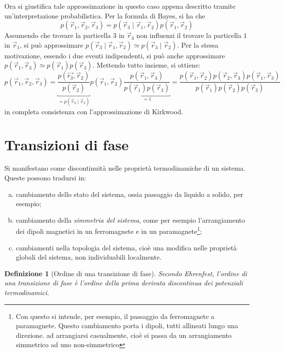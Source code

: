 \documentclass[11pt, a4paper]{scrartcl}
\theoremstyle{style}
\newtheorem{definizione}{Definizione}[section]
\theoremstyle{style1}
\numberwithin{equation}{subsection}
\begin{document}
Ora si giustifica tale approssimazione in questo caso appena descritto tramite un'interpretazione probabilistica.
Per la formula di Bayes, si ha che
\[
p(\vec{r}_1,\vec{r}_2, \vec{r}_3) = p(\vec{r}_3  \mid \vec{r}_1,\vec{r}_2) p(\vec{r}_1,\vec{r}_2)
\] 
Assumendo che trovare la particella $3$ in $\vec{r}_3$ non influenzi il trovare la particella $1$ in $\vec{r}_1$, si pu\`o approssimare $p(\vec{r}_3  \mid \vec{r}_1, \vec{r}_2) \simeq p(\vec{r}_3 \mid \vec{r}_2)$.
Per la stessa motivazione, essendo i due eventi indipendenti, si pu\`o anche approssimare $p(\vec{r}_1,\vec{r}_3) \simeq p(\vec{r}_1) p(\vec{r}_3)$.
Mettendo tutto insieme, si ottiene:
\[
	p(\vec{r}_1,\vec{r}_2, \vec{r}_3) = \underbracket{\frac{p(\vec{r_3},\vec{r}_2)}{p(\vec{r}_2)}}_{= p(\vec{r}_3 \mid \vec{r}_2)}  p(\vec{r}_1, \vec{r}_2) \underbracket{\frac{p(\vec{r}_1,\vec{r}_3)}{p(\vec{r}_1)p(\vec{r}_3)}}_{=1} = \frac{p(\vec{r}_1,\vec{r}_2) p(\vec{r}_2,\vec{r}_3)p(\vec{r}_1,\vec{r}_3)}{p(\vec{r}_1)p(\vec{r}_2)p(\vec{r}_3)}
\] 
in completa consistenza con l'approssimazione di Kirkwood.
\newpage
\section{Transizioni di fase}

Si manifestano come discontinuit\`a nelle propriet\`a termodinamiche di un sistema.
Queste possono tradursi in:
\begin{enumerate}[(a).]
	\item cambiamento dello stato del sistema, ossia passaggio da liquido a solido, per esempio;
	\item cambiamento della \textit{simmetria del sistema}, come per esempio l'arrangiamento dei dipoli magnetici in un ferromagnete e in un paramagnete\footnote{Con questo si intende, per esempio, il passaggio da ferromagnete a paramagnete. Questo cambiamento porta i dipoli, tutti allineati lungo una direzione. ad arrangiarsi casualmente, cio\`e si passa da un arrangiamento simmetrico ad uno non-simmetrico};
	\item cambiamenti nella topologia del sistema, cio\`e una modifica nelle propriet\`a globali del sistema, non individuabili localmente.
\end{enumerate}
\begin{definizione}
	[Ordine di una transizione di fase]
	Secondo Ehrenfest, l'ordine di una transizione di fase \`e l'ordine della prima derivata discontinua dei potenziali termodinamici.
\end{definizione}
\end{document}
